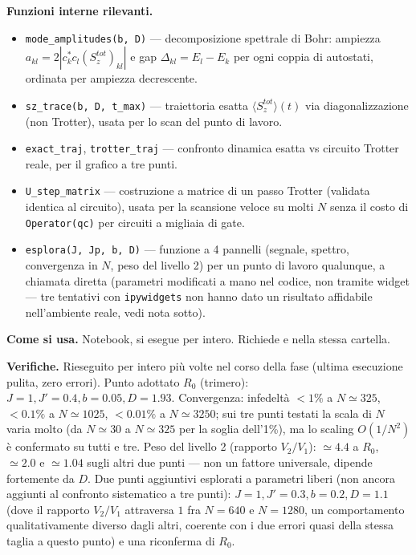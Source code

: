 \documentclass[11pt,a4paper]{article}
\begin{document}
\textbf{Funzioni interne rilevanti.}
\begin{itemize}
\item \texttt{mode\_amplitudes(b,\ D)} — decomposizione spettrale di Bohr:
ampiezza $a_{kl}=2|c_k^*c_l(S_z^{tot})_{kl}|$ e gap $\Delta_{kl}=E_l-E_k$ per ogni
coppia di autostati, ordinata per ampiezza decrescente.
\item \texttt{sz\_trace(b,\ D,\ t\_max)} — traiettoria esatta $\langle
S_z^{tot}\rangle(t)$ via diagonalizzazione (non Trotter), usata per lo scan del
punto di lavoro.
\item \texttt{exact\_traj}, \texttt{trotter\_traj} — confronto dinamica esatta vs
circuito Trotter reale, per il grafico a tre punti.
\item \texttt{U\_step\_matrix} — costruzione a matrice di un passo Trotter (validata
identica al circuito), usata per la scansione veloce su molti $N$ senza il costo di
\texttt{Operator(qc)} per circuiti a migliaia di gate.
\item \texttt{esplora(J,\ Jp,\ b,\ D)} — funzione a 4 pannelli (segnale, spettro,
convergenza in $N$, peso del livello 2) per un punto di lavoro qualunque, a chiamata
diretta (parametri modificati a mano nel codice, non tramite widget — tre tentativi
con \texttt{ipywidgets} non hanno dato un risultato affidabile nell'ambiente reale,
vedi nota sotto).
\end{itemize}

\textbf{Come si usa.} Notebook, si esegue per intero. Richiede
\texttt{} e \texttt{}
nella stessa cartella.

\textbf{Verifiche.} Rieseguito per intero più volte nel corso della fase (ultima
esecuzione pulita, zero errori). Punto adottato $R_0$ (trimero):
$J{=}1,J'{=}0.4,b{=}0.05,D{=}1.93$. Convergenza: infedeltà $<1\%$ a $N\simeq325$,
$<0.1\%$ a $N\simeq1025$, $<0.01\%$ a $N\simeq3250$; sui tre punti testati la scala
di $N$ varia molto (da $N\simeq30$ a $N\simeq325$ per la soglia dell'1\%), ma lo
scaling $O(1/N^2)$ è confermato su tutti e tre. Peso del livello 2 (rapporto
$V_2/V_1$): $\simeq4.4$ a $R_0$, $\simeq2.0$ e $\simeq1.04$ sugli altri due punti —
non un fattore universale, dipende fortemente da $D$. Due punti aggiuntivi esplorati
a parametri liberi (non ancora aggiunti al confronto sistematico a tre punti):
$J{=}1,J'{=}0.3,b{=}0.2,D{=}1.1$ (dove il rapporto $V_2/V_1$ attraversa $1$ fra
$N=640$ e $N=1280$, un comportamento qualitativamente diverso dagli altri, coerente
con i due errori quasi della stessa taglia a questo punto) e una riconferma di $R_0$.
\end{document}
